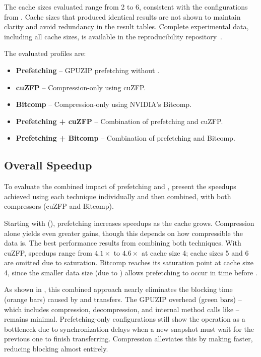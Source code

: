 \documentclass[Ingles]{ic-tese-v3}
\begin{document}
The cache sizes evaluated range from 2 to 6, consistent with the configurations from . Cache sizes that produced identical results are not shown to maintain clarity and avoid redundancy in the result tables. Complete experimental data, including all cache sizes, is available in the reproducibility repository~\cite{ds}.

The evaluated profiles are:

\begin{itemize}
    \item \textbf{Prefetching} – GPUZIP prefetching without \compression.
    \item \textbf{cuZFP} – Compression-only using cuZFP.
    \item \textbf{Bitcomp} – Compression-only using NVIDIA’s Bitcomp.
    \item \textbf{Prefetching + cuZFP} – Combination of prefetching and cuZFP.
    \item \textbf{Prefetching + Bitcomp} – Combination of prefetching and Bitcomp.
\end{itemize}

\subsection{Overall Speedup}
\label{sec:comppref_speeudup}
To evaluate the combined impact of prefetching and \compression,  present the speedups achieved using each technique individually and then combined, with both compressors (cuZFP and Bitcomp).

Starting with \revolve (), prefetching increases speedups as the cache grows. Compression alone yields even greater gains, though this depends on how compressible the data is. The best performance results from combining both techniques. With cuZFP, speedups range from $4.1\times$ to $4.6\times$ at cache size 4; cache sizes 5 and 6 are omitted due to saturation. Bitcomp reaches its saturation point at cache size 4, since the smaller data size (due to \compression) allows prefetching to occur in time before \restore.

As shown in , this combined approach nearly eliminates the blocking time (orange bars) caused by \dth and \htd transfers. The GPUZIP overhead (green bars) -- which includes compression, decompression, and internal method calls like \psa -- remains minimal. Prefetching-only configurations still show the \save operation as a bottleneck due to synchronization delays when a new snapshot must wait for the previous one to finish transferring. Compression alleviates this by making \dth faster, reducing \save blocking almost entirely.
\end{document}
